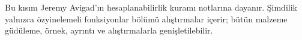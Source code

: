 \documentclass[../../include/open-logic-part]{subfiles}
\begin{document}

\begin{editorial}
  Bu kısım Jeremy Avigad'ın hesaplanabilirlik kuramı notlarına dayanır.
  Şimdilik yalnızca özyinelemeli fonksiyonlar bölümü alıştırmalar
  içerir; bütün malzeme güdüleme, örnek, ayrıntı ve alıştırmalarla
  genişletilebilir.
\end{editorial}



\OLEndPartHook
\end{document}

